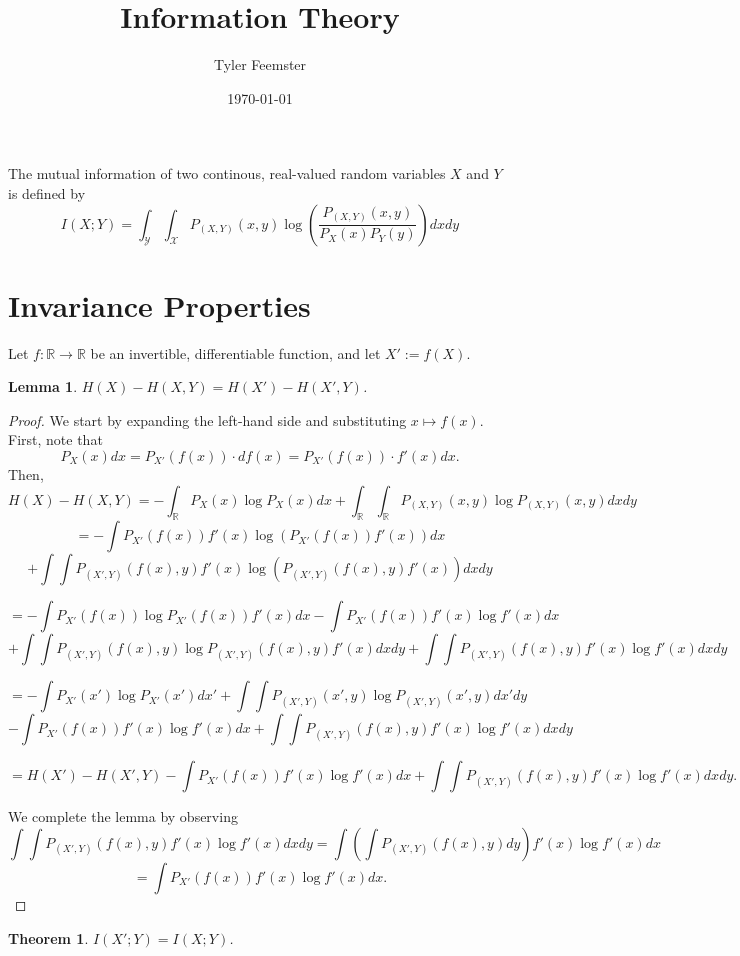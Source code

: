 \documentclass[12pt]{article}
\title{Information Theory}
\author{Tyler Feemster}
\date{\today}
\newcommand{\R}{\mathbb{R}}
\newtheorem{theorem}{Theorem}
\newtheorem{lemma}{Lemma}
\begin{document}
\maketitle

The mutual information of two continous, real-valued random variables $X$ and $Y$ is defined by
$$I(X;Y) = \int_{\mathcal{Y}}\int_{\mathcal{X}}P_{(X,Y)}(x,y)\log\left(\frac{P_{(X,Y)}(x,y)}{P_X(x)P_Y(y)}\right)dxdy$$

\section*{Invariance Properties}

Let $f : \R \to \R$ be an invertible, differentiable function, and let $X' := f(X)$.

\begin{lemma}\label{entropy difference}
$H(X) - H(X,Y) = H(X') - H(X',Y)$.
\end{lemma}
\begin{proof}
    We start by expanding the left-hand side and substituting $x \mapsto f(x)$. First, note that
$$P_X(x)dx = P_{X'}(f(x))\cdot df(x) = P_{X'}(f(x))\cdot f'(x) dx.$$
Then, 
$$H(X) - H(X,Y) = -\int_{\R} P_X(x)\log P_X(x) dx + \int_{\R}\int_{\R}P_{(X,Y)}(x,y)\log P_{(X,Y)}(x,y)dxdy$$
$$= -\int P_{X'}(f(x)) f'(x) \log (P_{X'}(f(x)) f'(x)) dx$$ 
$$+ \int \int P_{(X',Y)}(f(x),y)f'(x)\log (P_{(X',Y)}(f(x),y)f'(x))dxdy$$

$$= -\int P_{X'}(f(x)) \log P_{X'}(f(x)) f'(x) dx -\int P_{X'}(f(x)) f'(x) \log f'(x) dx $$
$$+ \int \int P_{(X',Y)}(f(x),y)\log P_{(X',Y)}(f(x),y)f'(x)dxdy + \int \int P_{(X',Y)}(f(x),y)f'(x) \log f'(x) dxdy$$

$$= -\int P_{X'}(x') \log P_{X'}(x') dx' + \int \int P_{(X',Y)}(x',y)\log P_{(X',Y)}(x',y)dx'dy$$
$$- \int P_{X'}(f(x)) f'(x) \log f'(x) dx + \int \int P_{(X',Y)}(f(x),y)f'(x) \log f'(x) dxdy$$

$$= H(X') - H(X',Y) - \int P_{X'}(f(x)) f'(x) \log f'(x) dx + \int \int P_{(X',Y)}(f(x),y)f'(x) \log f'(x) dxdy.$$

We complete the lemma by observing
$$\int \int P_{(X',Y)}(f(x),y)f'(x) \log f'(x) dxdy = \int\left(\int P_{(X',Y)}(f(x),y)dy\right) f'(x) \log f'(x) dx$$
$$= \int P_{X'}(f(x)) f'(x) \log f'(x) dx.$$
\end{proof}

\begin{theorem}\label{MI invariance}
$I(X';Y) = I(X;Y)$.
\end{theorem}
\end{document}
